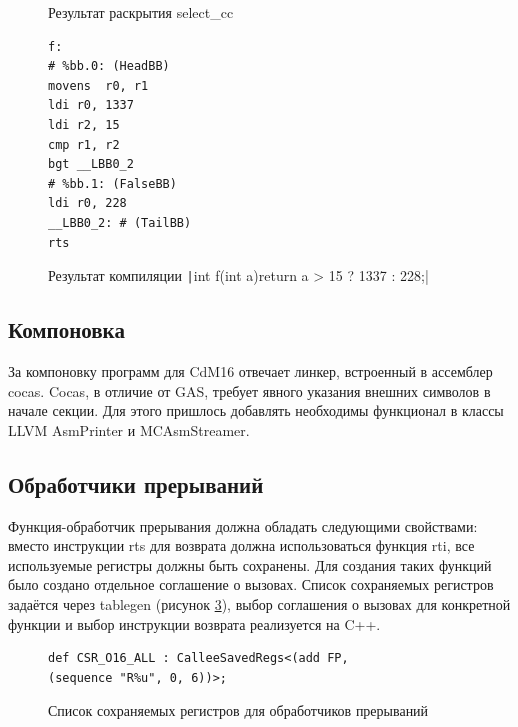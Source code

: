 \documentclass[a4paper,14pt]{extarticle}
\begin{document}
\begin{figure}[h!]
	\begin{center}
		\caption{Результат раскрытия select\_cc}
		\label{select-cc-expansion}
	\end{center}

\end{figure}

\begin{figure}[h!]
\begin{verbatim}
f:
# %bb.0: (HeadBB)
movens	r0, r1
ldi	r0, 1337
ldi	r2, 15
cmp	r1, r2
bgt	__LBB0_2
# %bb.1: (FalseBB)
ldi	r0, 228
__LBB0_2: # (TailBB)
rts
\end{verbatim}
\caption{Результат компиляции \texttt|int f(int a){return a > 15 ? 1337 : 228;}| }
\label{ternary-compilation}
\end{figure}

\subsection{Компоновка} 
За компоновку программ для CdM16 отвечает линкер, встроенный в ассемблер cocas.  Cocas, в отличие от GAS, требует явного указания внешних символов в начале секции. Для этого пришлось добавлять необходимы  функционал в классы LLVM AsmPrinter и MCAsmStreamer.

\subsection{Обработчики прерываний}
Функция-обработчик прерывания должна обладать следующими свойствами: вместо инструкции rts для возврата должна использоваться функция rti, все используемые регистры должны быть сохранены. Для создания таких функций было создано отдельное соглашение о вызовах. Список сохраняемых регистров задаётся через tablegen (рисунок \ref{saveregs}), выбор соглашения о вызовах для конкретной функции и выбор инструкции возврата реализуется на C++.
\begin{figure}[h!]
	\begin{verbatim}
def CSR_O16_ALL : CalleeSavedRegs<(add FP,
(sequence "R%u", 0, 6))>;
	\end{verbatim}
	\caption{Список сохраняемых регистров для обработчиков прерываний}
	\label{saveregs}
\end{figure}
\end{document}

